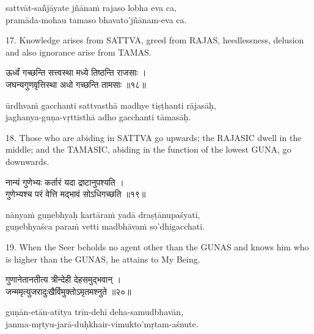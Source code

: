 \begin{transliteration}
sattvāt-sañjāyate jñānaṁ rajaso lobha eva ca, \\
pramāda-mohau tamaso bhavato'jñānam-eva ca.
\end{transliteration}

17. Knowledge arises from SATTVA, greed from RAJAS, heedlessness, delusion and
also ignorance arise from TAMAS.\@

\begin{gitaverse}
ऊर्ध्वं गच्छन्ति सत्त्वस्था मध्ये तिष्ठन्ति राजसाः । \\
जघन्यगुणवृत्तिस्था अधो गच्छन्ति तामसाः ॥१८॥
\end{gitaverse}

\begin{transliteration}
ūrdhvaṁ gacchanti sattvasthā madhye tiṣṭhanti rājasāḥ, \\
jaghanya-guṇa-vṛttisthā adho gacchanti tāmasāḥ.
\end{transliteration}

18. Those who are abiding in SATTVA go upwards; the RAJASIC dwell in the
middle; and the TAMASIC, abiding in the function of the lowest GUNA, go
downwards.

\begin{gitaverse}
नान्यं गुणेभ्यः कर्तारं यदा द्रष्टानुपश्यति । \\
गुणेभ्यश्च परं वेत्ति मद्भावं सोऽधिगच्छति ॥१९॥
\end{gitaverse}

\begin{transliteration}
nānyaṁ guṇebhyaḥ kartāraṁ yadā draṣṭānupaśyati, \\
guṇebhyaśca paraṁ vetti madbhāvaṁ so'dhigacchati.
\end{transliteration}

19. When the Seer beholds no agent other than the GUNAS and knows him who is
higher than the GUNAS, he attains to My Being.

\begin{gitaverse}
गुणानेतानतीत्य त्रीन्देही देहसमुद्भवान् । \\
जन्ममृत्युजरादुःखैर्विमुक्तोऽमृतमश्नुते ॥२०॥
\end{gitaverse}

\begin{transliteration}
guṇān-etān-atītya trīn-dehī deha-samudbhavān, \\
janma-mṛtyu-jarā-duḥkhair-vimukto'mṛtam-aśnute.
\end{transliteration}

